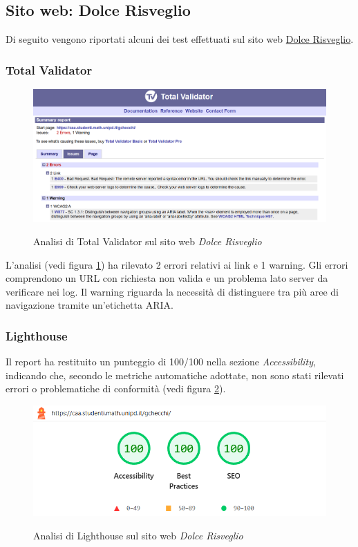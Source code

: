 \subsection{Sito web: Dolce Risveglio}
\noindent Di seguito vengono riportati alcuni dei test effettuati sul sito web \href{https://caa.studenti.math.unipd.it/gchecchi/}{Dolce Risveglio}.

\subsubsection{Total Validator}
\begin{figure}[H]
    \centering
    \includegraphics[width=0.9\linewidth, alt={Screenshot dell'analisi di Total Validator sul sito web Dolce Risveglio}]{img/TV_dolcerisveglio.png}
    \caption{Analisi di Total Validator sul sito web \textit{Dolce Risveglio}}\label{fig:TV_dolcerisveglio}
\end{figure}

\noindent L'analisi (vedi figura \ref{fig:TV_dolcerisveglio}) ha rilevato 2 errori relativi ai link e 1 warning. 
Gli errori comprendono un URL con richiesta non valida e un problema lato server da verificare nei log. 
Il warning riguarda la necessità di distinguere tra più aree di navigazione tramite un'etichetta ARIA. 

\subsubsection{Lighthouse}
\noindent Il report ha restituito un punteggio di 100/100 nella sezione \textit{Accessibility}, indicando che, secondo le metriche automatiche adottate, non sono stati rilevati errori o problematiche di conformità (vedi figura \ref{fig:Lighthouse_dolcerisveglio}).
\begin{figure}[H]
    \centering
    \includegraphics[width=0.6\linewidth, alt={Screenshot dell'analisi di Lighthouse sul sito web DolceRisveglio}]{img/Lighthouse_dolcerisveglio.png}
    \caption{Analisi di Lighthouse sul sito web \textit{Dolce Risveglio}}\label{fig:Lighthouse_dolcerisveglio}
\end{figure}


